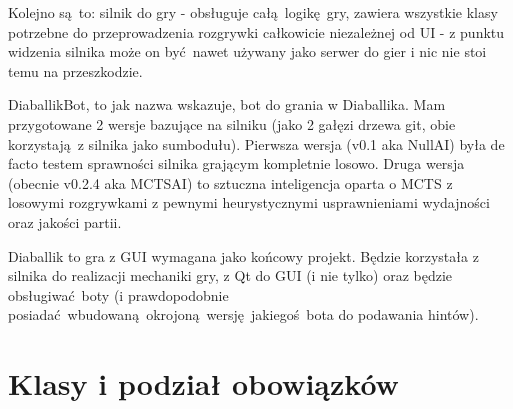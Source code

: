 \documentclass[a4paper,12pt]{article}
\begin{document}
Kolejno są to: silnik do gry - obsługuje całą logikę gry, zawiera wszystkie klasy potrzebne do przeprowadzenia rozgrywki całkowicie
niezależnej od UI - z punktu widzenia silnika może on być nawet używany jako serwer do gier i nic nie stoi temu na przeszkodzie. 

DiaballikBot, to jak nazwa wskazuje, bot do grania w Diaballika. Mam przygotowane 2 wersje bazujące na silniku (jako 2 gałęzi drzewa git, obie 
korzystają z silnika jako sumbodułu). Pierwsza wersja (v0.1 aka NullAI) była de facto testem sprawności silnika grającym kompletnie losowo. 
Druga wersja (obecnie v0.2.4 aka MCTSAI) to sztuczna inteligencja oparta o MCTS z losowymi rozgrywkami z pewnymi heurystycznymi usprawnieniami 
wydajności oraz jakości partii.

Diaballik to gra z GUI wymagana jako końcowy projekt. Będzie korzystała z silnika do realizacji mechaniki gry, z Qt do GUI (i nie tylko) oraz będzie
obsługiwać boty (i prawdopodobnie posiadać wbudowaną okrojoną wersję jakiegoś bota do podawania hintów).

\section{Klasy i podział obowiązków}
\end{document}
